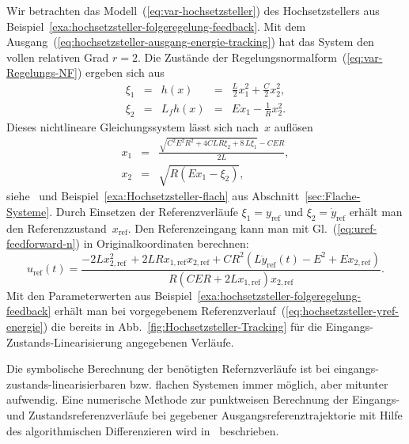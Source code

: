 \begin{example}
\label{exa:hochsetzsteller-folgeregelung-feedforward-flach}Wir betrachten
das Modell~(\ref{eq:var-hochsetzsteller}) des Hochsetzstellers
aus Beispiel~\ref{exa:hochsetzsteller-folgeregelung-feedback}. Mit
dem Ausgang~(\ref{eq:hochsetzsteller-ausgang-energie-tracking})
hat das System den vollen relativen Grad $r=2$. Die Zustände der
Regelungsnormalform~(\ref{eq:var-Regelungs-NF}) ergeben sich aus
\[
\begin{array}{lclcl}
\xi_{1} & = & h(x) & = & \frac{L}{2}x_{1}^{2}+\frac{C}{2}x_{2}^{2},\\
\xi_{2} & = & L_{f}h(x) & = & Ex_{1}-\frac{1}{R}x_{2}^{2}.
\end{array}
\]
Dieses nichtlineare Gleichungssystem lässt sich nach~$x$ auflösen
\begin{eqnarray*}
x_{1} & = & \frac{\sqrt{C^{2}E^{2}R^{2}+4CLR\xi_{2}+8\,L\xi_{1}}-CER}{2L},\\
x_{2} & = & \sqrt{R\left(Ex_{1}-\xi_{2}\right)},
\end{eqnarray*}
siehe~\cite{gensior2006} und Beispiel~\ref{exa:Hochsetzsteller-flach}
aus Abschnitt~\ref{sec:Flache-Systeme}. Durch Einsetzen der Referenzverläufe
$\xi_{1}=y_{\text{ref}}$ und $\xi_{2}=\dot{y}_{\text{ref}}$ erhält
man den Referenzzustand~$x_{\text{ref}}$. Den Referenzeingang kann
man mit Gl.~(\ref{eq:uref-feedforward-n}) in Originalkoordinaten
berechnen:
\[
u_{\text{ref}}(t)=\frac{-2Lx_{2,\text{ref}}^{2}\,+2LRx_{1,\text{ref}}x_{2,\text{ref}}+CR^{2}\left(L\ddot{y}_{\text{ref}}(t)-E^{2}+Ex_{2,\text{ref}}\right)}{R\left(CER+2Lx_{1,\text{ref}}\right)x_{2,\text{ref}}}.
\]
Mit den Parameterwerten aus Beispiel~\ref{exa:hochsetzsteller-folgeregelung-feedback}
erhält man bei vorgegebenem Referenzverlauf~(\ref{eq:hochsetzsteller-yref-energie})
die bereits in Abb.~\ref{fig:Hochsetzsteller-Tracking} für die Eingangs-Zustands-Linearisierung
angegebenen Verläufe.
\end{example}

\begin{remark}
Die symbolische Berechnung der benötigten Refernzverläufe ist bei
eingangs-zustands-linearisierbaren bzw. flachen Systemen immer möglich,
aber mitunter aufwendig. Eine numerische Methode zur punktweisen Berechnung
der Eingangs- und Zustandsreferenzverläufe bei gegebener Ausgangsreferenztrajektorie
mit Hilfe des algorithmischen Differenzieren wird in~\cite{roebvogel2000,roebenack2004automatica,roebenack2005habil}
beschrieben.
\end{remark}


